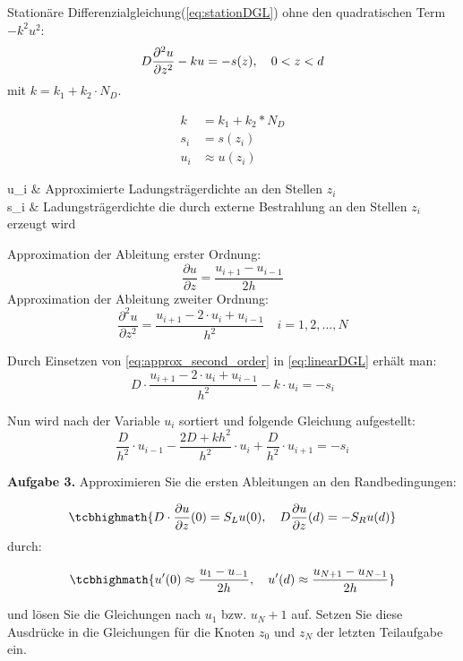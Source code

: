 Stationäre Differenzialgleichung(\cref{eq:stationDGL}) ohne den quadratischen Term $-k^2u^2$:
\begin{equation}\label{eq:linearDGL}
	D \pdv[2]{u}{z} -ku=-s(z), \quad 0 <z<d
\end{equation}
mit $k=k_1+k_2\cdot N_D$.

\begin{align*}
	k&=k_1+k_2*N_D\\
	s_i&= s(z_i)\\
	u_i&\approx u(z_i)
\end{align*}
\begin{conditions}
	u_i & Approximierte Ladungsträgerdichte an den Stellen $z_i$ \\
	s_i & Ladungsträgerdichte die durch externe Bestrahlung an den Stellen $z_i$ erzeugt wird
\end{conditions}

Approximation der Ableitung erster Ordnung:
\begin{equation}\label{eq:approx_first_order}
	\frac{\partial u}{\partial z} = \frac{u_{i+1} - u_{i-1}}{2h}
\end{equation}
Approximation der Ableitung zweiter Ordnung:
\begin{equation}\label{eq:approx_second_order}
	\frac{\partial ^2 u }{\partial z^2} = \frac{u_{i+1} - 2\cdot u_i + u_{i-1}}{h^2} \quad i=1,2,\dots,N
\end{equation}

Durch Einsetzen von \cref{eq:approx_second_order} in \cref{eq:linearDGL} erhält man:
\begin{equation}\label{eq:stationare_approx}
	D\cdot\frac{u_{i+1} - 2\cdot u_i + u_{i-1}}{h^2} -k\cdot u_i = -s_i
\end{equation}

\begin{qed}
Nun wird nach der Variable $u_i$ sortiert und folgende Gleichung aufgestellt:
\begin{equation}
	\frac{D}{h^2}\cdot u_{i-1} - \frac{2D+kh^2}{h^2}\cdot u_i + \frac{D}{h^2}\cdot u_{i+1} = -s_i
\end{equation}
\end{qed}


\begin{mybox}
	\textbf{Aufgabe 3.}	Approximieren Sie die ersten Ableitungen an den Randbedingungen:
	
	\begin{equation}
	 \tcbhighmath{	D\cdot \frac{\partial u}{\partial z}(0)=S_Lu(0),\quad D\frac{\partial u}{\partial z}(d)=-S_Ru(d)}
	\end{equation}
	durch:
	
	\begin{equation}
	 \tcbhighmath{	u'(0) \approx \frac{u_1-u_{-1}}{2h}, \quad u'(d) \approx \frac{u_{N+1}-u_{N-1}}{2h}}
	\end{equation}
	
	und lösen Sie die Gleichungen nach $u_1$ bzw. $u_N+1$ auf. Setzen Sie diese Ausdrücke in die Gleichungen für die Knoten $z_0$ und $z_N$ der letzten Teilaufgabe ein.
\end{mybox}



